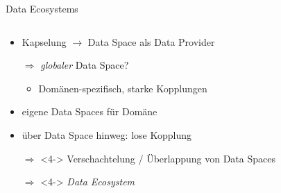 \begin{frame}{Data Ecosystems \footnotesize\cite{mollerIndustrialDataEcosystems2024}}
    \begin{columns}
        \begin{column}{0.6\textwidth}
            \begin{itemize}
                \item Kapselung $\to$ Data Space als Data Provider
                
                \item[$\Rightarrow$] \emph{globaler} Data Space?
                \begin{itemize}
                    \item<2-> Domänen-spezifisch, starke Kopplungen
                \end{itemize}


                \item<3-> eigene Data Spaces für Domäne
                \item<3-> über Data Space hinweg: lose Kopplung
                

                \item[$\Rightarrow$]<4-> Verschachtelung / Überlappung von Data Spaces
                \item[$\Rightarrow$]<4-> \alert{\emph{Data Ecosystem}}
                

\end{itemize}
\end{column}
\end{columns}
\end{frame}
